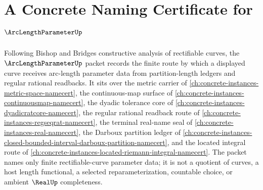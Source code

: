 \chapter{A Concrete Naming Certificate for $\ArcLengthParameterUp$}
\label{ch:concrete-instances-arc-length-parameter-namecert}

Following Bishop and Bridges constructive analysis of rectifiable curves, the $\ArcLengthParameterUp$ packet records the finite route by which a displayed curve receives arc-length parameter data from partition-length ledgers and regular rational readbacks. It sits over the metric carrier of \autoref{ch:concrete-instances-metric-space-namecert}, the continuous-map surface of \autoref{ch:concrete-instances-continuousmap-namecert}, the dyadic tolerance core of \autoref{ch:concrete-instances-dyadicratcore-namecert}, the regular rational readback route of \autoref{ch:concrete-instances-regseqrat-namecert}, the terminal real-name seal of \autoref{ch:concrete-instances-real-namecert}, the Darboux partition ledger of \autoref{ch:concrete-instances-closed-bounded-interval-darboux-partition-namecert}, and the located integral route of \autoref{ch:concrete-instances-located-riemann-integral-namecert}. The packet names only finite rectifiable-curve parameter data; it is not a quotient of curves, a host length functional, a selected reparameterization, countable choice, or ambient $\RealUp$ completeness.

